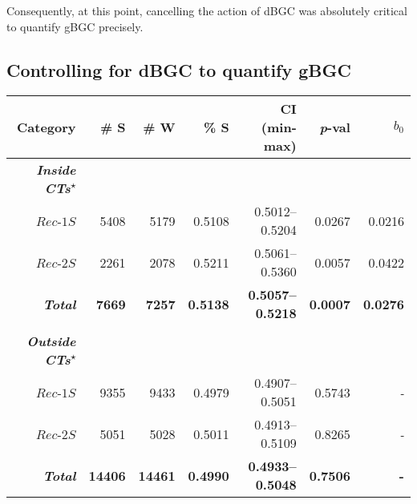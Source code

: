 Consequently, at this point, cancelling the action of dBGC was absolutely critical to quantify gBGC precisely.







\subsection{Controlling for dBGC to quantify gBGC}

\begin{table}[b!]
    \centering
	\begin{adjustbox}{width = 1\textwidth}
		\begin{tabular}{rrrrrrr}


			\toprule
			\textbf{Category} & \textbf{\# S} & \textbf{\# W} & \textbf{\% S} & \textbf{CI (min-max)} & \textbf{\textit{p}-val} & \textbf{$b_0$} \\


			\midrule
			\textbf{\textit{Inside CTs\textsuperscript{$\star$}}}\\
			$Rec$-$1S$                 & 5408 & 5179 & 0.5108 & 0.5012--0.5204 & 0.0267 & 0.0216 \\
			$Rec$-$2S$                 & 2261 & 2078 & 0.5211 & 0.5061--0.5360 & 0.0057 & 0.0422 \\
			\textbf{\textit{Total}}    & \textbf{7669} & \textbf{7257} & \textbf{0.5138} & \textbf{0.5057--0.5218} & \textbf{0.0007} & \textbf{0.0276} \\
			\\
			\textbf{\textit{Outside CTs\textsuperscript{$\star$}}}\\
			$Rec$-$1S$                 & 9355 & 9433 & 0.4979 & 0.4907--0.5051 & 0.5743 & \textit{-} \\
			$Rec$-$2S$                 & 5051 & 5028 & 0.5011 & 0.4913--0.5109 & 0.8265 & \textit{-} \\
			\textbf{\textit{Total}}    & \textbf{14406} & \textbf{14461} & \textbf{0.4990} & \textbf{0.4933--0.5048} & \textbf{0.7506} & \textbf{-} \\
			\bottomrule


\end{tabular}
\end{adjustbox}
\end{table}
